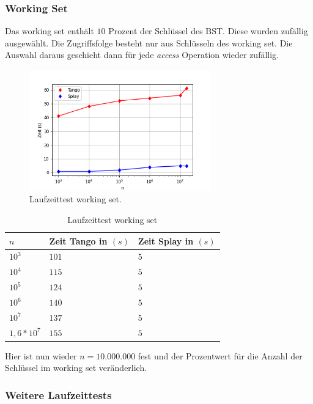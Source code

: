 \documentclass[a4paper,12pt]{article}
\begin{document}
\subsubsection{Working Set}
Das working set enthält $10$ Prozent der Schlüssel des BST. Diese wurden zufällig ausgewählt. Die Zugriffsfolge besteht nur aus Schlüsseln des working set. Die Auswahl daraus geschieht dann für jede \textit{access} Operation wieder zufällig.
 \begin{figure}[H]
	\centering
	\includegraphics[width=0.7\textwidth]{"Medien/laufzeittest/diagramm/workingset"}
	\caption{Laufzeittest working set.}
\end{figure}
\begin{table}[H]
	\begin{center}
		\begin{tabular}[c]{|l|l|l|}
			\hline
			$n$ & Zeit Tango in $\left(s\right)$ &Zeit Splay in $\left(s\right)$ \\
			\hline
			$10^3$ & $101$ &$5$ \\
			\hline
			$10^4$  & $115$ &$5$  \\
			\hline
			$10^5$  & $124$ &$5$  \\
			\hline
			$10^6$  & $140$ &$5$  \\
			\hline
			$10^7$  & $137$ &$5$  \\
			\hline
			$1,6 *10^7$  & $155$ &$5$  \\
			\hline
		\end{tabular}
		\caption{Laufzeittest working set} 
	\end{center}
\end{table}
\noindent Hier ist nun wieder $n = 10.000.000$ fest und der Prozentwert für die Anzahl der Schlüssel im working set veränderlich.
\subsubsection{Weitere Laufzeittests}
\end{document}
